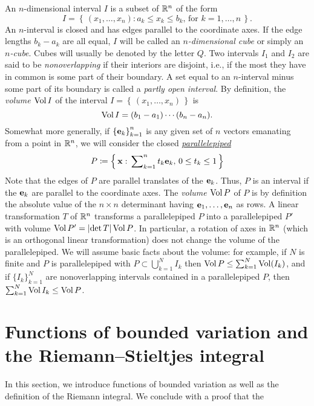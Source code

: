 An $n$-dimensional interval $I$ is a subset of $\mathbb{R}^n$ of the form
\begin{equation}
\label{eq:1:n-interval}
I=\left\{\,(x_1,\dotsc,x_n):\text{$a_k\leq x_k\leq b_k$, for $k=1,\dotsc,n$}\,\right\}.
\end{equation}
An $n$-interval is closed and has edges parallel to the coordinate axes. If
the edge lengths $b_k-a_k$ are all equal, $I$ will be called an
\emph{$n$-dimensional cube} or simply an \emph{$n$-cube}. Cubes will
usually be denoted by the letter $Q$. Two intervals $I_1$ and $I_2$ are
said to be \emph{nonoverlapping} if their interiors are disjoint, i.e., if
the most they have in common is some part of their boundary. A set equal to
an $n$-interval minus some part of its boundary is called a \emph{partly
  open interval}. By definition, the \emph{volume $\operatorname{Vol} I$} of the interval
$I=\left\{\,(x_1,\dotsc,x_n)\,\right\}$ is
\begin{equation}
  \label{eq:1:volume-of-n-interval}
\operatorname{Vol} I=(b_1-a_1)\dotsm(b_n-a_n).
\end{equation}
Somewhat more generally, if ${\{\mathbf{e}_k\}}_{k=1}^n$ is any given set of $n$
vectors emanating from a point in $\mathbb{R}^n$, we will consider the closed
\href{https://en.wikipedia.org/wiki/Parallelepiped}{\emph{parallelepiped}}
\begin{equation}
  \label{eq:1:parallelepiped}
P\coloneqq\left\{\,\mathbf{x}:\text{$\sideset{}{_{k=1}^n}\sum t_k\mathbf{e}_k$, $0\leq
    t_k\leq 1$}\,\right\}
\end{equation}
Note that the edges of $P$ are parallel translates of the $\mathbf{e}_k$. Thus,
$P$ is an interval if the $\mathbf{e}_k$ are parallel to the coordinate axes. The
\emph{volume $\operatorname{Vol} P$} of $P$ is by definition the absolute value of the
$n\times n$ determinant having $\mathbf{e}_1,\dotsc,\mathbf{e}_n$ as rows. A linear
transformation $T$ of $\mathbb{R}^n$ transforms a parallelepiped $P$ into a
parallelepiped $P'$ with volume $\operatorname{Vol} P'=|{\det T}|\operatorname{Vol} P$. In particular,
a rotation of axes in $\mathbb{R}^n$ (which is an orthogonal linear
transformation) does not change the volume of the parallelepiped. We will
assume basic facts about the volume: for example, if $N$ is finite and $P$
is parallelepiped with $P\subset\bigcup_{k=1}^N I_k$ then $\operatorname{Vol}
P\leq\sum_{k=1}^N\operatorname{Vol}(I_k)$, and if ${\{I_k\}}_{k=1}^N$ are nonoverlapping
intervals contained in a parallelepiped $P$, then $\sum_{k=1}^N\operatorname{Vol}
I_k\leq\operatorname{Vol} P$.

\section{Functions of bounded variation and the Riemann--Stieltjes
  integral}
In this section, we introduce functions of bounded variation as well as the
definition of the Riemann integral. We conclude with a proof that the


